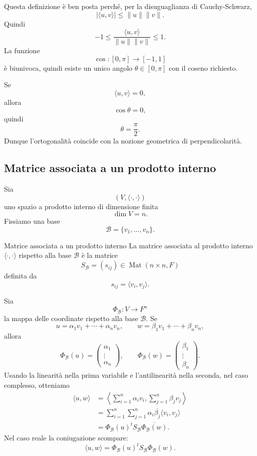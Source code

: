 \documentclass[a4paper]{article}
\begin{document}
Questa definizione è ben posta perché, per la disuguaglianza di Cauchy-Schwarz,
\[
    |\langle u,v\rangle|
    \leq
    \|u\|\|v\|.
\]
Quindi
\[
    -1
    \leq
    \frac{\langle u,v\rangle}{\|u\|\|v\|}
    \leq
    1.
\]
La funzione
\[
    \cos:[0,\pi]\to[-1,1]
\]
è biunivoca, quindi esiste un unico angolo \(\theta\in[0,\pi]\) con il coseno richiesto.

\begin{snippetremark}{}
    Se
    \[
        \langle u,v\rangle=0,
    \]
    allora
    \[
        \cos\theta=0,
    \]
    quindi
    \[
        \theta=\frac{\pi}{2}.
    \]
    Dunque l'ortogonalità coincide con la nozione geometrica di perpendicolarità.
\end{snippetremark}

\subsection{Matrice associata a un prodotto interno}

Sia
\[
    (V,\langle\cdot,\cdot\rangle)
\]
uno spazio a prodotto interno di dimensione finita
\[
    \dim V=n.
\]
Fissiamo una base
\[
    \mathcal{B}=\{v_1,\ldots,v_n\}.
\]

\begin{snippetdefinition}{Matrice associata a un prodotto interno}
    La matrice associata al prodotto interno \(\langle\cdot,\cdot\rangle\) rispetto alla base \(\mathcal{B}\) è la matrice
    \[
        S_{\mathcal{B}}=(s_{ij})\in\operatorname{Mat}(n\times n,F)
    \]
    definita da
    \[
        s_{ij}=\langle v_i,v_j\rangle.
    \]
\end{snippetdefinition}

Sia
\[
    \Phi_{\mathcal{B}}:V\to F^n
\]
la mappa delle coordinate rispetto alla base \(\mathcal{B}\). Se
\[
    u=\alpha_1v_1+\cdots+\alpha_nv_n,
    \qquad
    w=\beta_1v_1+\cdots+\beta_nv_n,
\]
allora
\[
    \Phi_{\mathcal{B}}(u)=
    \begin{pmatrix}
        \alpha_1\\
        \vdots\\
        \alpha_n
    \end{pmatrix},
    \qquad
    \Phi_{\mathcal{B}}(w)=
    \begin{pmatrix}
        \beta_1\\
        \vdots\\
        \beta_n
    \end{pmatrix}.
\]
Usando la linearità nella prima variabile e l'antilinearità nella seconda, nel caso complesso, otteniamo
\begin{align*}
    \langle u,w\rangle
    &=
    \left\langle
    \sum_{i=1}^{n}\alpha_i v_i,
    \sum_{j=1}^{n}\beta_j v_j
    \right\rangle\\
    &=
    \sum_{i=1}^{n}\sum_{j=1}^{n}
    \alpha_i\overline{\beta_j}
    \langle v_i,v_j\rangle\\
    &=
    \Phi_{\mathcal{B}}(u)^t
    S_{\mathcal{B}}
    \overline{\Phi_{\mathcal{B}}(w)}.
\end{align*}
Nel caso reale la coniugazione scompare:
\[
    \langle u,w\rangle
    =
    \Phi_{\mathcal{B}}(u)^t
    S_{\mathcal{B}}
    \Phi_{\mathcal{B}}(w).
\]
\end{document}

